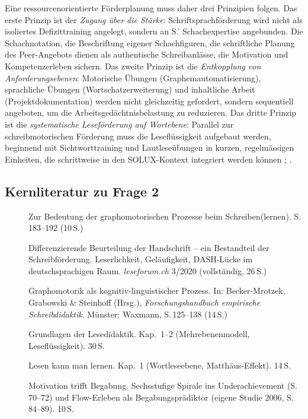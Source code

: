 \documentclass[ngerman, a4paper]{article}
\begin{document}
Eine ressourcenorientierte Förderplanung muss daher drei Prinzipien folgen. Das erste
Prinzip ist der \textit{Zugang über die Stärke}: Schriftsprachförderung wird nicht als
isoliertes Defizittraining angelegt, sondern an S.' Schachexpertise angebunden. Die
Schachnotation, die Beschriftung eigener Schachfiguren, die schriftliche Planung des
Peer-Angebots dienen als authentische Schreibanlässe, die Motivation und Kompetenzerleben
sichern. Das zweite Prinzip ist die \textit{Entkopplung von Anforderungsebenen}: Motorische
Übungen (Graphemautomatisierung), sprachliche Übungen (Wortschatzerweiterung) und
inhaltliche Arbeit (Projektdokumentation) werden nicht gleichzeitig gefordert, sondern
sequentiell angeboten, um die Arbeitsgedächtnisbelastung zu reduzieren. Das dritte
Prinzip ist die \textit{systematische Leseförderung auf Wortebene}: Parallel zur
schreibmotorischen Förderung muss die Leseflüssigkeit aufgebaut werden, beginnend
mit Sichtworttraining und Lautleseübungen in kurzen, regelmässigen Einheiten, die
schrittweise in den SOLUX-Kontext integriert werden können
\parencite[Kap.\,1--4]{rosebrock2010grundlagen};
\parencite[Kap.\,1--4]{gold2018lesenkannmanlernen}.

\subsection{Kernliteratur zu Frage 2}
 
\begin{description}
  \item[\cite{sturm2016graphomotorik}] Zur Bedeutung der graphomotorischen
    Prozesse beim Schreiben(lernen). S.\,183--192 (10\,S.)
  \item[\cite{hurschler2020handschriftbeurteilung}] Differenzierende
    Beurteilung der Handschrift -- ein Bestandteil der Schreibförderung.
    Leserlichkeit, Geläufigkeit, DASH-Lücke im deutschsprachigen Raum.
    \textit{leseforum.ch} 3/2020 (vollständig, 26\,S.)
  \item[\cite{nottbusch2017graphomotorik}] Graphomotorik als
    kognitiv-linguistischer Prozess. In: Becker-Mrotzek, Grabowski \&
    Steinhoff (Hrsg.), \textit{Forschungshandbuch empirische Schreibdidaktik}.
    Münster: Waxmann, S.\,125--138 (14\,S.)
  \item[\cite{rosebrock2010grundlagen}] Grundlagen der Lesedidaktik.
    Kap.~1--2 (Mehrebenenmodell, Leseflüssigkeit). 30\,S.
  \item[\cite{gold2018lesenkannmanlernen}] Lesen kann man lernen.
    Kap.~1 (Wortleseebene, Matthäus-Effekt). 14\,S.
  \item[\cite{lehwald2017motivation}] Motivation trifft Begabung.
    Sechsstufige Spirale ins Underachievement (S.\,70--72) und Flow-Erleben
    als Begabungsprädiktor (eigene Studie 2006, S.\,84--89). 10\,S.
\end{description}
 
\end{document}
